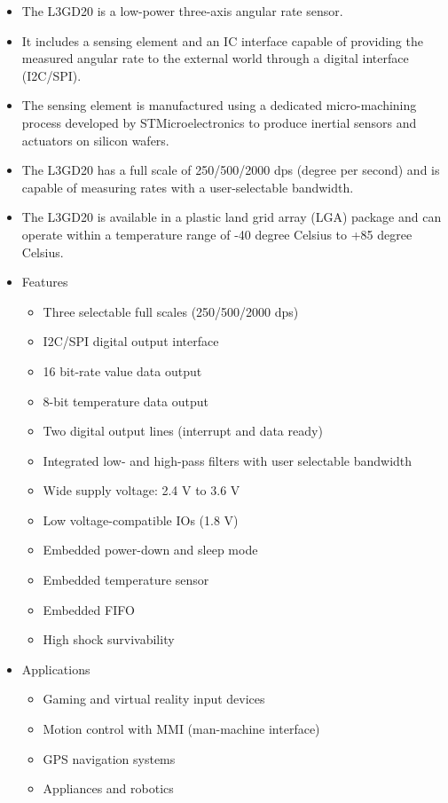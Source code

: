 \documentclass[11pt,a4paper]{article}
\begin{document}
\begin{itemize}
\item The L3GD20 is a low-power three-axis angular
rate sensor.

\item It includes a sensing element and an IC interface
capable of providing the measured angular rate to
the external world through a digital interface
(I2C/SPI).

\item The sensing element is manufactured using a
dedicated  micro-machining process developed by
STMicroelectronics to produce inertial sensors
and actuators on silicon wafers.

\item The L3GD20 has a full scale of 250/500/2000
dps (degree per second) and is capable of measuring rates with a
user-selectable bandwidth.

\item The L3GD20 is available in a plastic land grid
array (LGA) package and can operate within a
temperature range of -40 degree Celsius to +85 degree Celsius.

\item Features 
\begin{itemize}
\item Three selectable full scales (250/500/2000
dps)
\item I2C/SPI digital output interface
\item 16 bit-rate value data output
\item 8-bit temperature data output
\item Two digital output lines (interrupt and data
ready)
\item Integrated low- and high-pass filters with user selectable
bandwidth
\item Wide supply voltage: 2.4 V to 3.6 V
\item Low voltage-compatible IOs (1.8 V)
\item Embedded power-down and sleep mode
\item Embedded temperature sensor
\item Embedded FIFO
\item High shock survivability

\end{itemize}

\item Applications
\begin{itemize}
\item Gaming and virtual reality input devices
\item Motion control with MMI (man-machine
interface)
\item GPS navigation systems
\item Appliances and robotics
\end{itemize}



\end{itemize}
\end{document}
